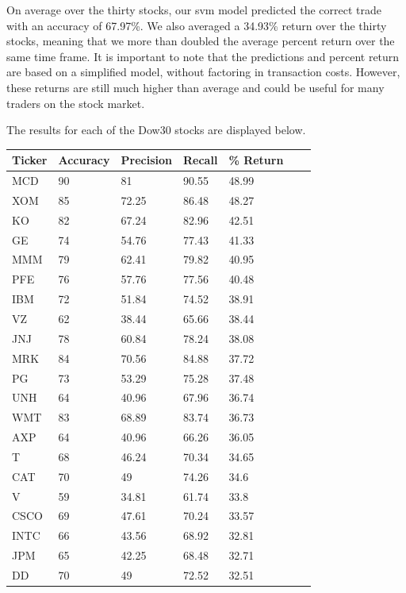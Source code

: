 \documentclass{article}
\begin{document}
On average over the thirty stocks, our svm model predicted the correct trade with an accuracy of 67.97\%. We also averaged a 34.93\% return over the thirty stocks, meaning that we more than doubled the average percent return over the same time frame. It is important to note that the predictions and percent return are based on a simplified model, without factoring in transaction costs. However, these returns are still much higher than average and could be useful for many traders on the stock market.

The results for each of the Dow30 stocks are displayed below.

\begin{table}[h!]
  \begin{tabular}{@{}lllllll@{}}
    \toprule
    Ticker & Accuracy & Precision & Recall & \% Return & \\ \midrule
    MCD & 90 & 81 & 90.55 & 48.99 & \\
    XOM & 85 & 72.25 & 86.48 & 48.27 & \\
    KO & 82 & 67.24 & 82.96 & 42.51 & \\
    GE & 74 & 54.76 & 77.43 & 41.33 & \\
    MMM & 79 & 62.41 & 79.82 & 40.95 & \\
    PFE & 76 & 57.76 & 77.56 & 40.48 & \\
    IBM & 72 & 51.84 & 74.52 & 38.91 & \\
    VZ & 62 & 38.44 & 65.66 & 38.44 & \\
    JNJ & 78 & 60.84 & 78.24 & 38.08 & \\
    MRK & 84 & 70.56 & 84.88 & 37.72 & \\
    PG & 73 & 53.29 & 75.28 & 37.48 & \\
    UNH & 64 & 40.96 & 67.96 & 36.74 & \\
    WMT & 83 & 68.89 & 83.74 & 36.73 & \\
    AXP & 64 & 40.96 & 66.26 & 36.05 & \\
    T & 68 & 46.24 & 70.34 & 34.65 & \\
    CAT & 70 & 49 & 74.26 & 34.6 & \\
    V & 59 & 34.81 & 61.74 & 33.8 & \\
    CSCO & 69 & 47.61 & 70.24 & 33.57 & \\
    INTC & 66 & 43.56 & 68.92 & 32.81 & \\
    JPM & 65 & 42.25 & 68.48 & 32.71 & \\
    DD & 70 & 49 & 72.52 & 32.51 & \\

\end{tabular}
\end{table}
\end{document}
